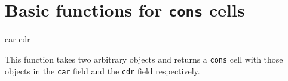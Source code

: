 \chapter{Basic functions for \texttt{cons} cells}
\label{chap-basic-cons-functions}

 {car cdr}

This function takes two arbitrary \lisp{} objects and returns a
\texttt{cons} cell with those objects in the \texttt{car} field and
the \texttt{cdr} field respectively.
